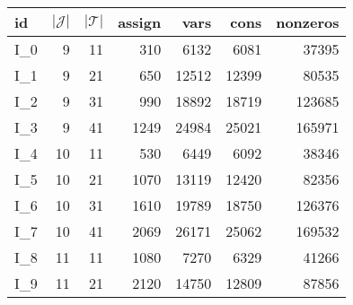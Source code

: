 \begin{tabular}{lrrrrrr}
\toprule
   id &  $|\mathcal{J}|$ &  $|\mathcal{T}|$ &  assign &  vars &  cons &  nonzeros \\
\midrule
 I\_0 &                9 &               11 &     310 &  6132 &  6081 &     37395 \\
 I\_1 &                9 &               21 &     650 & 12512 & 12399 &     80535 \\
 I\_2 &                9 &               31 &     990 & 18892 & 18719 &    123685 \\
 I\_3 &                9 &               41 &    1249 & 24984 & 25021 &    165971 \\
 I\_4 &               10 &               11 &     530 &  6449 &  6092 &     38346 \\
 I\_5 &               10 &               21 &    1070 & 13119 & 12420 &     82356 \\
 I\_6 &               10 &               31 &    1610 & 19789 & 18750 &    126376 \\
 I\_7 &               10 &               41 &    2069 & 26171 & 25062 &    169532 \\
 I\_8 &               11 &               11 &    1080 &  7270 &  6329 &     41266 \\
 I\_9 &               11 &               21 &    2120 & 14750 & 12809 &     87856 \\
\bottomrule
\end{tabular}
